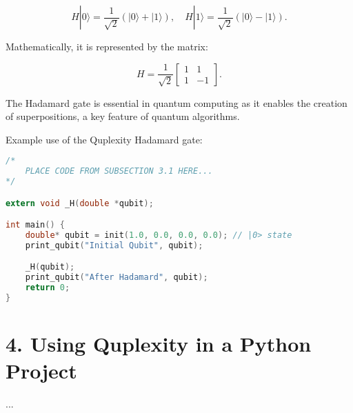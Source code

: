 \documentclass{article}
\begin{document}
\[
H|0\rangle = \frac{1}{\sqrt{2}}(|0\rangle + |1\rangle), \quad H|1\rangle = \frac{1}{\sqrt{2}}(|0\rangle - |1\rangle).
\]

Mathematically, it is represented by the matrix:

\[
H = \frac{1}{\sqrt{2}} \begin{bmatrix}
1 & 1 \\
1 & -1
\end{bmatrix}.
\]

The Hadamard gate is essential in quantum computing as it enables the creation of superpositions, a key feature of quantum algorithms.

Example use of the Quplexity Hadamard gate:

\begin{lstlisting}[language=C, frame=single]
/*
    PLACE CODE FROM SUBSECTION 3.1 HERE...
*/

extern void _H(double *qubit);

int main() {
    double* qubit = init(1.0, 0.0, 0.0, 0.0); // |0> state
    print_qubit("Initial Qubit", qubit);

    _H(qubit);
    print_qubit("After Hadamard", qubit);
    return 0;
}
\end{lstlisting}





\section*{4. Using Quplexity in a Python Project}
...
\end{document}
